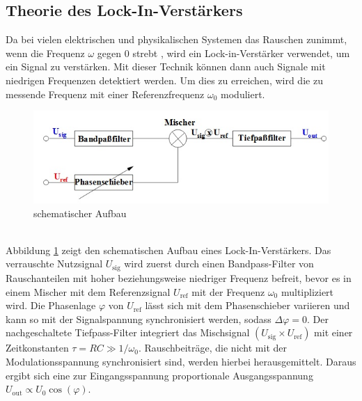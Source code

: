 \subsection{Theorie des Lock-In-Verstärkers}
Da bei vielen elektrischen und physikalischen Systemen das Rauschen zunimmt, wenn
die Frequenz $\omega$ gegen 0 strebt \cite{enet}, wird ein Lock-in-Verstärker
verwendet, um ein Signal zu verstärken. Mit dieser Technik können dann auch
Signale mit niedrigen Frequenzen detektiert werden. Um dies zu erreichen, wird die
zu messende Frequenz mit einer Referenzfrequenz $\omega_0$ moduliert. \\
\begin{figure}[h]
  \includegraphics{Bilder/Schema.jpg}
  \caption{schematischer Aufbau\,\cite{303}}
  \label{fig:schema}
\end{figure} \\
Abbildung \ref{fig:schema} zeigt den schematischen Aufbau eines Lock-In-Verstärkers.
Das verrauschte Nutzsignal $U_\text{sig}$ wird zuerst durch einen Bandpass-Filter
von Rauschanteilen mit hoher beziehungsweise niedriger Frequenz befreit, bevor
es in einem Mischer mit dem Referenzsignal $U_\text{ref}$ mit der Frequenz $\omega_0$
multipliziert wird. Die Phasenlage $\varphi$ von $U_\text{ref}$ lässt sich mit dem
Phasenschieber variieren und kann so mit der Signalspannung synchronisiert werden,
sodass $\Delta\varphi =0$.
Der nachgeschaltete Tiefpass-Filter integriert das Mischsignal $(U_\text{sig}\times U_\text{ref})$
mit einer Zeitkonstanten $\tau = RC \gg 1/\omega_0$.
Rauschbeiträge, die nicht mit der Modulationsspannung synchronisiert sind, werden
hierbei herausgemittelt. Daraus ergibt sich eine zur Eingangsspannung proportionale
Ausgangsspannung $U_\text{out} \propto U_0 \cos(\varphi)$.

